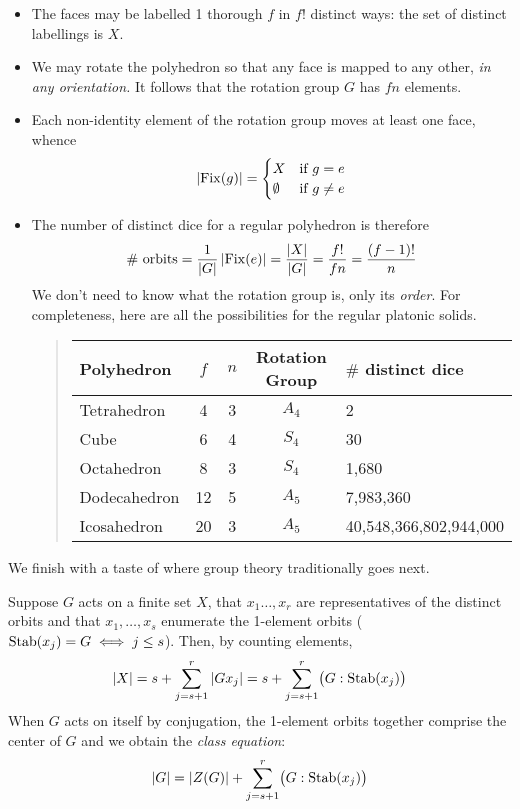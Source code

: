 \begin{itemize}
  \item The faces may be labelled 1 thorough $f$ in $f!$ distinct ways: the set of distinct labellings is $X$.
  \item We may rotate the polyhedron so that any face is mapped to any other, \emph{in any orientation.} It follows that the rotation group $G$ has $fn$ elements.
	\item Each non-identity element of the rotation group moves at least one face, whence
	\[
		\left| \operatorname{Fix}(g)\right|=
		\begin{cases}
			X&\text{if }g=e\\
			\emptyset&\text{if }g\neq e
		\end{cases}
	\]
	\item The number of distinct dice for a regular polyhedron is therefore
	\[
		\text{\# orbits}
		=\frac 1{\left| G\right|}\left| \operatorname{Fix}(e)\right|
		=\frac{\left| X\right|}{\left| G\right|}
		=\frac{f!}{fn}
		=\frac{(f-1)!}{n}
	\]
	We don't need to know what the rotation group is, only its \emph{order}. For completeness, here are all the possibilities for the regular platonic solids.
	\begin{quote}
		\begin{tabular}{l|c|c|c|l}
			Polyhedron & $f$ & $n$ & Rotation Group & $\#$ distinct dice\\\hline
			Tetrahedron & 4 & 3 & $A_4$ & 2\\
			Cube & 6 & 4 & $S_4$ & 30\\
			Octahedron & 8 & 3 &  $S_4$ & 1,680\\
			Dodecahedron & 12 & 5 & $A_5$ & 7,983,360\\
			Icosahedron & 20 & 3 & $A_5$ & 40,548,366,802,944,000
		\end{tabular}
	\end{quote}
\end{itemize} 


\goodbreak


We finish with a taste of where group theory traditionally goes next.\smallbreak

Suppose $G$ acts on a finite set $X$, that $x_1\ldots,x_r$ are representatives of the distinct orbits and that $x_1,\ldots,x_s$ enumerate the 1-element orbits ($\operatorname{Stab}(x_j)=G \iff j\le s$). Then, by counting elements,
\[
	\left| X\right|=s+\sum_{j=s+1}^r\left| Gx_j\right| 
	=s+\sum_{j=s+1}^r\bigl(G:\operatorname{Stab}(x_j)\bigr)
\]
When $G$ acts on itself by conjugation, the 1-element orbits together comprise the center of $G$ and we obtain the \emph{class equation}:
\[
	\left| G\right|=\left| Z(G)\right|+\sum_{j=s+1}^r \bigl(G:\operatorname{Stab}(x_j)\bigr)
\]

